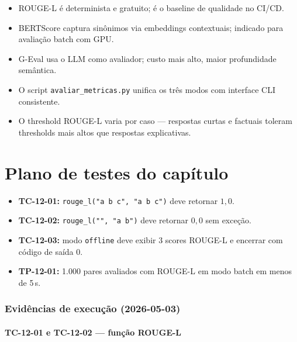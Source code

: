 \begin{itemize}[leftmargin=*]
  \item ROUGE-L \'e determinista e gratuito; \'e o baseline
        de qualidade no CI/CD.
  \item BERTScore captura sin\^onimos via embeddings contextuais;
        indicado para avalia\c{c}\~ao batch com GPU.
  \item G-Eval usa o LLM como avaliador; custo mais alto,
        maior profundidade sem\^antica.
  \item O script \texttt{avaliar\_metricas.py} unifica os tr\^es
        modos com interface CLI consistente.
  \item O threshold ROUGE-L varia por caso --- respostas curtas
        e factuais toleram thresholds mais altos que respostas
        explicativas.
\end{itemize}

\section{Plano de testes do cap\'itulo}

\begin{itemize}[leftmargin=*]
  \item \textbf{TC-12-01:} \texttt{rouge\_l("a b c", "a b c")}
        deve retornar $1{,}0$.
  \item \textbf{TC-12-02:} \texttt{rouge\_l("", "a b")} deve
        retornar $0{,}0$ sem exce\c{c}\~ao.
  \item \textbf{TC-12-03:} modo \texttt{offline} deve exibir
        3 scores ROUGE-L e encerrar com c\'odigo de sa\'ida $0$.
  \item \textbf{TP-12-01:} 1.000 pares avaliados com ROUGE-L em
        modo batch em menos de 5\,s.
\end{itemize}

\subsubsection*{Evid\^encias de execu\c{c}\~ao (2026-05-03)}

\paragraph{TC-12-01 e TC-12-02 --- fun\c{c}\~ao ROUGE-L}

